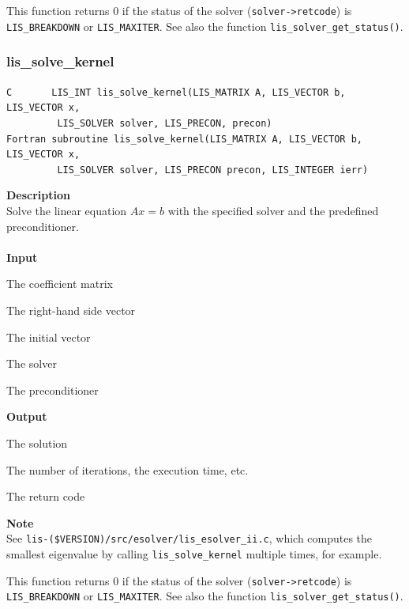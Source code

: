 \documentclass[a4paper]{article}
\newcommand{\namelistlabel}[1]{\mbox{#1}\hfill}
\newenvironment{namelist}[1]{%
\begin{list}{}
  {\let\makelabel\namelistlabel
  \settowidth{\labelwidth}{#1}
  \setlength{\leftmargin}{1.1\labelwidth}}
  }{%
\end{list}}
\begin{document}
This function returns 0 if the status of the solver ({\tt solver->retcode})
is {\tt LIS\_BREAKDOWN} or {\tt LIS\_MAXITER}. See also the function
{\tt lis\_solver\_get\_status()}. 

\newpage
\subsubsection{lis\_solve\_kernel}
\begin{screen}
\verb|C       LIS_INT lis_solve_kernel(LIS_MATRIX A, LIS_VECTOR b, LIS_VECTOR x,|\\
\verb|         LIS_SOLVER solver, LIS_PRECON, precon)|\\
\verb|Fortran subroutine lis_solve_kernel(LIS_MATRIX A, LIS_VECTOR b, LIS_VECTOR x,|\\
\verb|         LIS_SOLVER solver, LIS_PRECON precon, LIS_INTEGER ierr)|
\end{screen}
{\bf Description}\\
\indent
Solve the linear equation $Ax = b$ with the specified solver and the predefined preconditioner.
\\ \\
\noindent
{\bf Input}
\begin{namelist}{XXXXXXXXXXXXXXXXXXXX}
\item[\tt A] The coefficient matrix
\item[\tt b] The right-hand side vector
\item[\tt x] The initial vector
\item[\tt solver] The solver
\item[\tt precon] The preconditioner
\end{namelist}
{\bf Output}
\begin{namelist}{XXXXXXXXXXXXXXXXXXXX}
\item[\tt x] The solution
\item[\tt solver] The number of iterations, the execution time, etc.
\item[\tt ierr] The return code
\end{namelist}
{\bf Note}\\
\indent
See {\tt lis-(\$VERSION)/src/esolver/lis\_esolver\_ii.c}, 
which computes the smallest eigenvalue by calling 
\verb|lis_solve_kernel| multiple times, for example. 

This function returns 0 if the status of the solver ({\tt solver->retcode})
is {\tt LIS\_BREAKDOWN} or {\tt LIS\_MAXITER}. See also the function
{\tt lis\_solver\_get\_status()}. 
\end{document}
